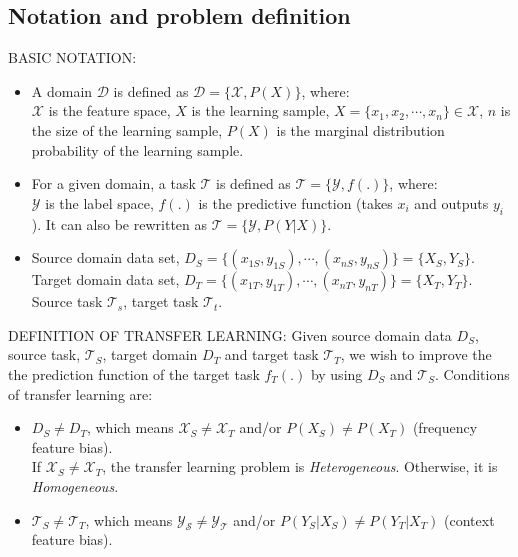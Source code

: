 \subsection{Notation and problem definition}
\par BASIC NOTATION:
\begin{itemize}[noitemsep]
    \item A domain $\mathcal{D}$ is defined as $\mathcal{D} = \{\mathcal{X}, P(X)\}$, where:\\
    $\mathcal{X}$ is the feature space, $X$ is the learning sample, $X = \{x_1,x_2,\cdots,x_n\} \in \mathcal{X}$, $n$ is the size of the learning sample, $P(X)$ is the marginal distribution probability of the learning sample.

    \item For a given domain, a task $\mathcal{T}$ is defined as $\mathcal{T} = \{\mathcal{Y}, f(.)\}$, where:\\
    $\mathcal{Y}$ is the label space, $f(.)$ is the predictive function (takes $x_i$ and outputs $y_i$). It can also be rewritten as $\mathcal{T} = \{\mathcal{Y}, P(Y|X)\}$.

    \item Source domain data set, $D_S = \{(x_{1S},y_{1S}),\cdots,(x_{nS},y_{nS})\} = \{X_S,Y_S\}$.\\ Target domain data set, $D_T = \{(x_{1T},y_{1T}),\cdots,(x_{nT},y_{nT})\}= \{X_T,Y_T\}$.\\
    Source task $\mathcal{T}_s$, target task $\mathcal{T}_t$.
\end{itemize}


\par DEFINITION OF TRANSFER LEARNING: Given source domain data $D_S$, source task, $\mathcal{T}_S$,  target domain $D_T$ and target task $\mathcal{T}_T$, we wish to improve the the prediction function of the target task $f_T(.)$ by using $D_S$ and $\mathcal{T}_S$. Conditions of transfer learning are:

\begin{itemize}[noitemsep]
    \item $D_S \neq D_T$, which means $\mathcal{X}_S \neq \mathcal{X}_T$ and/or $P(X_S) \neq P(X_T)$ (frequency feature bias).\\
    If $\mathcal{X}_S \neq \mathcal{X}_T$, the transfer learning problem is \textit{Heterogeneous}. Otherwise, it is \textit{Homogeneous}.

    \item $\mathcal{T}_S \neq \mathcal{T}_T$, which means $\mathcal{Y_S} \neq \mathcal{Y_T}$ and/or $P(Y_S|X_S) \neq P(Y_T|X_T)$ (context feature bias).
\end{itemize}

